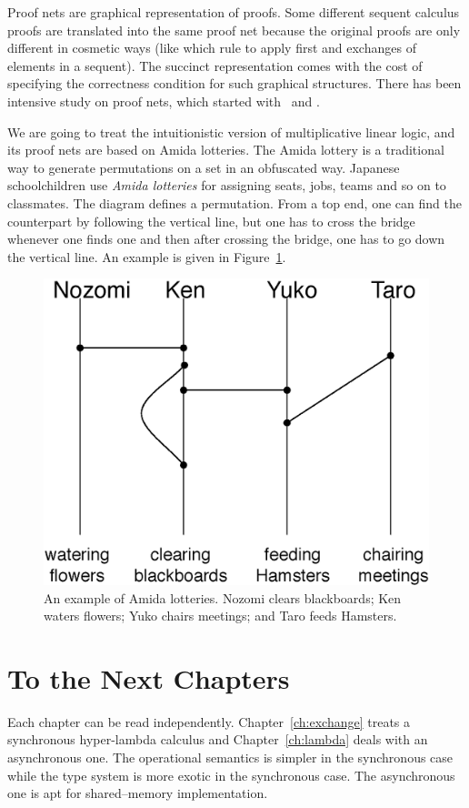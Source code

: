 Proof nets are graphical representation of proofs.
Some different sequent calculus proofs are translated into the same
proof net because the original proofs are only different in cosmetic
ways (like which rule to apply first and exchanges of elements in a
sequent).
The succinct representation comes with the cost of specifying
the correctness condition for such graphical structures.
There has been intensive study on proof nets,
which started with~\citet{girard1987} and \citet{danos-regnier}.

 We are going to treat the intuitionistic version of
 multiplicative linear logic, and its proof nets are based on Amida
 lotteries.
 The Amida lottery is a traditional way to generate permutations on a set%
 in an obfuscated way.
 Japanese schoolchildren use \textit{Amida lotteries}
 for assigning seats, jobs, teams and so on to classmates.
 The diagram defines a permutation.
 From a top end, one can find the counterpart by following the vertical
 line, but one has to cross the bridge whenever one finds one and then
 after crossing the bridge, one has to go down the vertical line.
 An example is given in Figure~\ref{amida-lottery}.

 \begin{figure}[h]
  \centering
  \includegraphics[scale=0.6]{amida.eps}
  \caption[An example of Amida lotteries.]{An example of Amida
  lotteries.  Nozomi clears blackboards; Ken waters flowers; Yuko chairs
  meetings; and Taro feeds Hamsters.}
  \label{amida-lottery}
 \end{figure}


\section{To the Next Chapters}

Each chapter can be read independently.
Chapter~\ref{ch:exchange} treats a synchronous hyper-lambda calculus and
Chapter~\ref{ch:lambda} deals with an asynchronous one.
The operational semantics is simpler in the synchronous case while
the type system is more exotic in the synchronous case.
The asynchronous one is apt for shared--memory implementation.
